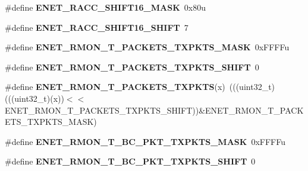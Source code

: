 \begin{DoxyCompactItemize}
\item 
\#define {\bfseries E\+N\+E\+T\+\_\+\+R\+A\+C\+C\+\_\+\+S\+H\+I\+F\+T16\+\_\+\+M\+A\+SK}~0x80u\hypertarget{group__ENET__Register__Masks_gac74a3eea05cf48034e6891edbbf92428}{}\label{group__ENET__Register__Masks_gac74a3eea05cf48034e6891edbbf92428}

\item 
\#define {\bfseries E\+N\+E\+T\+\_\+\+R\+A\+C\+C\+\_\+\+S\+H\+I\+F\+T16\+\_\+\+S\+H\+I\+FT}~7\hypertarget{group__ENET__Register__Masks_gaa96c07fba3d15bc1cdd32bd4f7b94998}{}\label{group__ENET__Register__Masks_gaa96c07fba3d15bc1cdd32bd4f7b94998}

\item 
\#define {\bfseries E\+N\+E\+T\+\_\+\+R\+M\+O\+N\+\_\+\+T\+\_\+\+P\+A\+C\+K\+E\+T\+S\+\_\+\+T\+X\+P\+K\+T\+S\+\_\+\+M\+A\+SK}~0x\+F\+F\+F\+Fu\hypertarget{group__ENET__Register__Masks_gaae18bf5610b11cd5c5418e426bfc9faf}{}\label{group__ENET__Register__Masks_gaae18bf5610b11cd5c5418e426bfc9faf}

\item 
\#define {\bfseries E\+N\+E\+T\+\_\+\+R\+M\+O\+N\+\_\+\+T\+\_\+\+P\+A\+C\+K\+E\+T\+S\+\_\+\+T\+X\+P\+K\+T\+S\+\_\+\+S\+H\+I\+FT}~0\hypertarget{group__ENET__Register__Masks_gaedbb5b49e8c1f579fb37ff45c77739b1}{}\label{group__ENET__Register__Masks_gaedbb5b49e8c1f579fb37ff45c77739b1}

\item 
\#define {\bfseries E\+N\+E\+T\+\_\+\+R\+M\+O\+N\+\_\+\+T\+\_\+\+P\+A\+C\+K\+E\+T\+S\+\_\+\+T\+X\+P\+K\+TS}(x)~(((uint32\+\_\+t)(((uint32\+\_\+t)(x))$<$$<$E\+N\+E\+T\+\_\+\+R\+M\+O\+N\+\_\+\+T\+\_\+\+P\+A\+C\+K\+E\+T\+S\+\_\+\+T\+X\+P\+K\+T\+S\+\_\+\+S\+H\+I\+FT))\&E\+N\+E\+T\+\_\+\+R\+M\+O\+N\+\_\+\+T\+\_\+\+P\+A\+C\+K\+E\+T\+S\+\_\+\+T\+X\+P\+K\+T\+S\+\_\+\+M\+A\+SK)\hypertarget{group__ENET__Register__Masks_ga8e671cdf2c95c8dfd6c9260b47360901}{}\label{group__ENET__Register__Masks_ga8e671cdf2c95c8dfd6c9260b47360901}

\item 
\#define {\bfseries E\+N\+E\+T\+\_\+\+R\+M\+O\+N\+\_\+\+T\+\_\+\+B\+C\+\_\+\+P\+K\+T\+\_\+\+T\+X\+P\+K\+T\+S\+\_\+\+M\+A\+SK}~0x\+F\+F\+F\+Fu\hypertarget{group__ENET__Register__Masks_ga025847a04f4151ea174abb193896779d}{}\label{group__ENET__Register__Masks_ga025847a04f4151ea174abb193896779d}

\item 
\#define {\bfseries E\+N\+E\+T\+\_\+\+R\+M\+O\+N\+\_\+\+T\+\_\+\+B\+C\+\_\+\+P\+K\+T\+\_\+\+T\+X\+P\+K\+T\+S\+\_\+\+S\+H\+I\+FT}~0\hypertarget{group__ENET__Register__Masks_ga85a6d86c558cd12bad95c0bd1fa9ac42}{}\label{group__ENET__Register__Masks_ga85a6d86c558cd12bad95c0bd1fa9ac42}


\end{DoxyCompactItemize}
